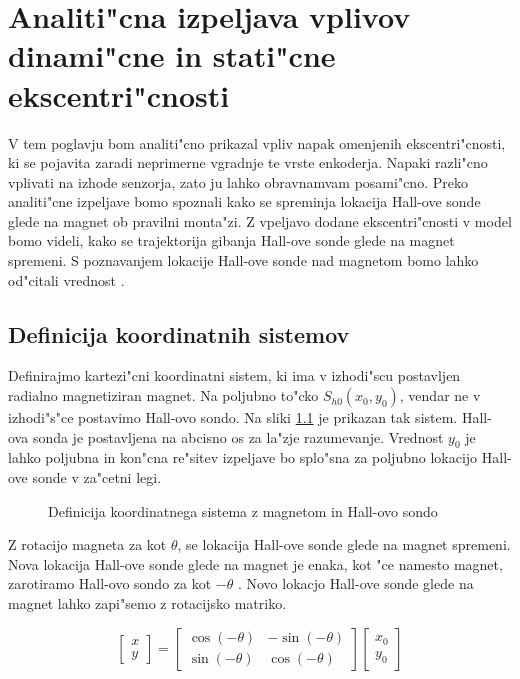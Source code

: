 \chapter{Analiti"cna izpeljava vplivov dinami"cne in stati"cne ekscentri"cnosti}

V tem poglavju bom analiti"cno prikazal vpliv napak omenjenih ekscentri"cnosti, ki se pojavita zaradi neprimerne vgradnje te vrste enkoderja. Napaki razli"cno vplivati na izhode senzorja, zato ju lahko obravnamvam posami"cno. Preko analiti"cne izpeljave bomo spoznali kako se spreminja lokacija Hall-ove sonde glede na magnet ob pravilni monta"zi. Z vpeljavo dodane ekscentri"cnosti v model bomo videli, kako se trajektorija gibanja Hall-ove sonde glede na magnet spremeni. S poznavanjem lokacije Hall-ove sonde nad magnetom bomo lahko od"citali vrednost \Bz.


\section{Definicija koordinatnih sistemov}

Definirajmo kartezi"cni koordinatni sistem, ki ima v izhodi"scu postavljen radialno magnetiziran magnet. Na poljubno to"cko $S_{h0}(x_0,y_0)$, vendar ne v izhodi"s"ce postavimo Hall-ovo sondo. Na sliki \ref{fig:def_kks} je prikazan tak sistem. Hall-ova sonda je postavljena na abcisno os za la"zje razumevanje. Vrednost $y_0$ je lahko poljubna in kon"cna re"sitev izpeljave bo splo"sna za poljubno lokacijo Hall-ove sonde v za"cetni legi.

\begin{figure}[h!]
	\centering
	\caption{Definicija koordinatnega sistema z magnetom in Hall-ovo sondo}
	\label{fig:def_kks}
\end{figure}

Z rotacijo magneta za kot $\theta$, se lokacija Hall-ove sonde glede na magnet spremeni. Nova lokacija Hall-ove sonde glede na magnet je enaka, kot "ce namesto magnet, zarotiramo Hall-ovo sondo za kot $-\theta$ . Novo lokacjo Hall-ove sonde glede na magnet lahko zapi"semo z rotacijsko matriko.

\begin{equation}
\label{equ:rotacija_hall}
\begin{bmatrix} x\\y \end{bmatrix}=
\begin{bmatrix} \cos(-\theta)&-\sin(-\theta)\\\sin(-\theta)&\cos(-\theta) \end{bmatrix}
\begin{bmatrix} x_0\\y_0 \end{bmatrix}
\end{equation}

